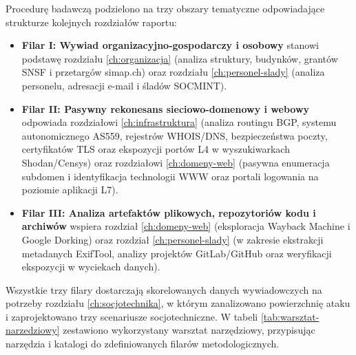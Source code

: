 Procedurę badawczą podzielono na trzy obszary tematyczne odpowiadające strukturze kolejnych rozdziałów raportu:
\begin{itemize}
    \item \textbf{Filar I: Wywiad organizacyjno-gospodarczy i osobowy} stanowi podstawę rozdziału \ref{ch:organizacja} (analiza struktury, budynków, grantów SNSF i przetargów simap.ch) oraz rozdziału \ref{ch:personel-slady} (analiza personelu, adresacji e-mail i śladów SOCMINT).
    \item \textbf{Filar II: Pasywny rekonesans sieciowo-domenowy i webowy} odpowiada rozdziałowi \ref{ch:infrastruktura} (analiza routingu BGP, systemu autonomicznego AS559, rejestrów WHOIS/DNS, bezpieczeństwa poczty, certyfikatów TLS oraz ekspozycji portów L4 w wyszukiwarkach Shodan/Censys) oraz rozdziałowi \ref{ch:domeny-web} (pasywna enumeracja subdomen i identyfikacja technologii WWW oraz portali logowania na poziomie aplikacji L7).
    \item \textbf{Filar III: Analiza artefaktów plikowych, repozytoriów kodu i archiwów} wspiera rozdział \ref{ch:domeny-web} (eksploracja Wayback Machine i Google Dorking) oraz rozdział \ref{ch:personel-slady} (w zakresie ekstrakcji metadanych ExifTool, analizy projektów GitLab/GitHub oraz weryfikacji ekspozycji w wyciekach danych).
\end{itemize}

Wszystkie trzy filary dostarczają skorelowanych danych wywiadowczych na potrzeby rozdziału \ref{ch:socjotechnika}, w którym zanalizowano powierzchnię ataku i zaprojektowano trzy scenariusze socjotechniczne. W tabeli \ref{tab:warsztat-narzedziowy} zestawiono wykorzystany warsztat narzędziowy, przypisując narzędzia i katalogi do zdefiniowanych filarów metodologicznych.

